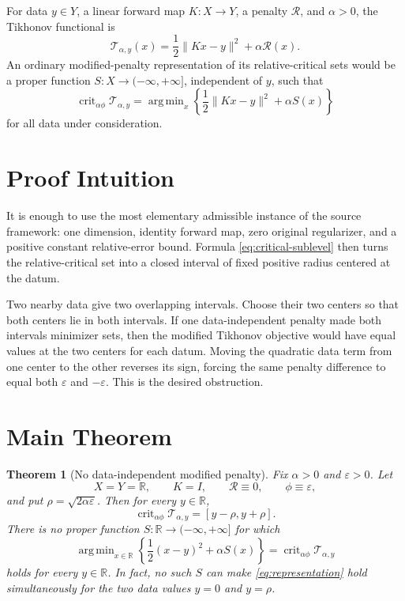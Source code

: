 \documentclass[11pt]{article}
\newtheorem{theorem}{Theorem}
\DeclareMathOperator*{\argmin}{arg\,min}
\newcommand{\crit}{\operatorname{crit}}
\begin{document}
For data \(y\in Y\), a linear forward map \(K:X\to Y\), a penalty
\(\mathcal R\), and \(\alpha>0\), the Tikhonov functional is
\[
 \mathcal T_{\alpha,y}(x)
 =\frac12\lVert Kx-y\rVert^2+\alpha\mathcal R(x).
\]
An ordinary modified-penalty representation of its relative-critical sets
would be a proper function \(S:X\to(-\infty,+\infty]\), independent of \(y\),
such that
\[
 \crit_{\alpha\phi}\mathcal T_{\alpha,y}
 =\argmin_x\left\{\frac12\lVert Kx-y\rVert^2+\alpha S(x)\right\}
\]
for all data under consideration.

\clearpage
\section*{Proof Intuition}

It is enough to use the most elementary admissible instance of the source
framework: one dimension, identity forward map, zero original regularizer, and
a positive constant relative-error bound. Formula
\eqref{eq:critical-sublevel} then turns the relative-critical set into a closed
interval of fixed positive radius centered at the datum.

Two nearby data give two overlapping intervals. Choose their two centers so
that both centers lie in both intervals. If one data-independent penalty made
both intervals minimizer sets, then the modified Tikhonov objective would have
equal values at the two centers for each datum. Moving the quadratic data term
from one center to the other reverses its sign, forcing the same penalty
difference to equal both \(\varepsilon\) and \(-\varepsilon\). This is the
desired obstruction.

\section*{Main Theorem}

\begin{theorem}[No data-independent modified penalty]
\label{thm:main}
Fix \(\alpha>0\) and \(\varepsilon>0\). Let
\[
 X=Y=\mathbb R,\qquad K=I,\qquad \mathcal R\equiv0,
 \qquad \phi\equiv\varepsilon,
\]
and put \(\rho=\sqrt{2\alpha\varepsilon}\). Then for every \(y\in\mathbb R\),
\[
 \crit_{\alpha\phi}\mathcal T_{\alpha,y}
 =[y-\rho,y+\rho].
\]
There is no proper function \(S:\mathbb R\to(-\infty,+\infty]\) for which
\begin{equation}
\label{eq:representation}
 \argmin_{x\in\mathbb R}
 \left\{\frac12(x-y)^2+\alpha S(x)\right\}
 =\crit_{\alpha\phi}\mathcal T_{\alpha,y}
\end{equation}
holds for every \(y\in\mathbb R\). In fact, no such \(S\) can make
\eqref{eq:representation} hold simultaneously for the two data values
\(y=0\) and \(y=\rho\).
\end{theorem}
\end{document}
